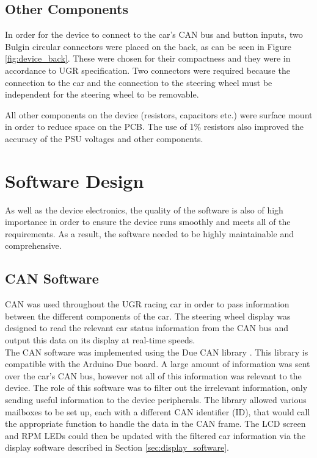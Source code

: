 \documentclass[a4paper,12pt]{article}
\begin{document}


\subsection{Other Components}
\label{sec:other_components}

In order for the device to connect to the car's CAN bus and button inputs, two Bulgin circular connectors were placed on the back, as can be seen in Figure \ref{fig:device_back}. These were chosen for their compactness and they were in accordance to UGR specification. Two connectors were required because the connection to the car and the connection to the steering wheel must be independent for the steering wheel to be removable.



All other components on the device (resistors, capacitors etc.) were surface mount in order to reduce space on the PCB. The use of 1\% resistors also improved the accuracy of the PSU voltages and other components. \\


\newpage
\section{Software Design}
\label{sec:software_design}

As well as the device electronics, the quality of the software is also of high importance in order to ensure the device runs smoothly and meets all of the requirements. As a result, the software needed to be highly maintainable and comprehensive.

\subsection{CAN Software}
\label{sec:CAN_software}

CAN was used throughout the UGR racing car in order to pass information between the different components of the car. The steering wheel display was designed to read the relevant car status information from the CAN bus and output this data on its display at real-time speeds. \\

The CAN software was implemented using the Due CAN library \cite{due_can}. This library is compatible with the Arduino Due board. A large amount of information was sent over the car's CAN bus, however not all of this information was relevant to the device. The role of this software was to filter out the irrelevant information, only sending useful information to the device peripherals. The library allowed various mailboxes to be set up, each with a different CAN identifier (ID), that would call the appropriate function to handle the data in the CAN frame. The LCD screen and RPM LEDs could then be updated with the filtered car information via the display software described in Section \ref{sec:display_software}. \\
\end{document}
